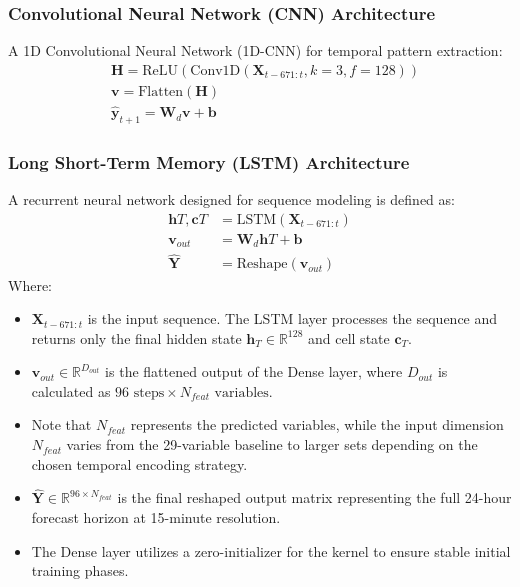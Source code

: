 \documentclass[conference]{IEEEtran}
\begin{document}
\subsubsection{\textbf{Convolutional Neural Network (CNN) Architecture}}
A 1D Convolutional Neural Network (1D-CNN) for temporal pattern extraction:
\begin{equation} 
	\begin{split}
		&\mathbf{H} = \text{ReLU}(\text{Conv1D}(\mathbf{X}_{t-671:t}, k=3, f=128)) \\ 
		&\mathbf{v} = \text{Flatten}(\mathbf{H}) \\ 
		&\hat{\mathbf{y}}_{t+1} = \mathbf{W}_{d} \mathbf{v} + \mathbf{b} 
	\end{split} 
\end{equation}

\subsubsection{\textbf{Long Short-Term Memory (LSTM) Architecture}}
A recurrent neural network designed for sequence modeling is defined as:
\begin{equation}
	\begin{split}
		\mathbf{h}T, \mathbf{c}T &= \text{LSTM}(\mathbf{X}_{t-671:t}) \\
		\mathbf{v}_{out} &= \mathbf{W}_d \mathbf{h}T + \mathbf{b} \\
		\hat{\mathbf{Y}} &= \text{Reshape}(\mathbf{v}_{out})
	\end{split}
\end{equation}
Where:
\begin{itemize}
	\item $\mathbf{X}_{t-671:t}$ is the input sequence. The LSTM layer processes the sequence and returns only the final hidden state $\mathbf{h}_T \in \mathbb{R}^{128}$ and cell state $\mathbf{c}_T$.
	\item $\mathbf{v}_{out} \in \mathbb{R}^{D_{out}}$ is the flattened output of the Dense layer, where $D_{out}$ is calculated as $96 \text{ steps} \times N_{feat} \text{ variables}$.
	\item Note that $N_{feat}$ represents the predicted variables, while the input dimension $N_{feat}$ varies from the 29-variable baseline to larger sets depending on the chosen temporal encoding strategy.
	\item $\hat{\mathbf{Y}} \in \mathbb{R}^{96 \times N_{feat}}$ is the final reshaped output matrix representing the full 24-hour forecast horizon at 15-minute resolution.
	\item The Dense layer utilizes a zero-initializer for the kernel to ensure stable initial training phases.
\end{itemize}
\end{document}
